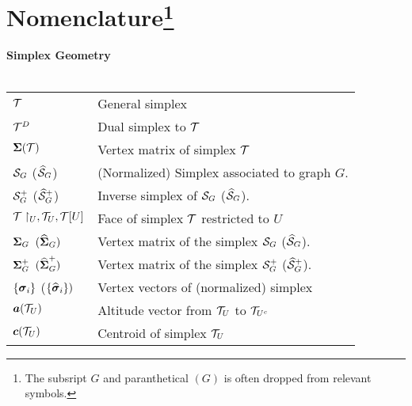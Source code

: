 \chapter*{Nomenclature\footnote{The subsript $G$ and paranthetical $(G)$ is often dropped from relevant symbols.}}

\newlength{\colwidth} %
\newlength{\groupsep} %
\newlength{\headingsep} %
\setlength{\colwidth}{3.5cm}
\setlength{\groupsep}{1cm}
\setlength{\headingsep}{0.05cm}

\textbf{Simplex Geometry}\\
\vspace{\headingsep}\\
\begin{tabular}{p{\colwidth}l}
	{$\mathcal{T}$} & {General simplex} \\
	$\mathcal{T}^D$ & Dual simplex to $\mathcal{T}$ \\
	$\boldsymbol{\Sigma}(\mathcal{T})$ & Vertex matrix of simplex $\mathcal{T}$ \\
	$\mathcal{S}_G$ ($\widehat{\mathcal{S}}_G$)  &  (Normalized) Simplex associated to graph $G$.\\
	$\mathcal{S}^+_G$ ($\widehat{\mathcal{S}}^+_G$)	& Inverse simplex of $\mathcal{S}_G$ ($\widehat{\mathcal{S}}_G$).\\
	{$\mathcal{T}\restriction_U, \mathcal{T}_U, \mathcal{T}[U]$} & {Face of simplex $\mathcal{T}$ restricted to $U$ }\\ 
	{$\boldsymbol{\Sigma}_G$ $(\widehat{\boldsymbol{\Sigma}}_G)$} & Vertex matrix of the simplex $\mathcal{S}_G$ ($\widehat{\mathcal{S}}_G$). \\
	{$\boldsymbol{\Sigma}_G^+$ $(\widehat{\boldsymbol{\Sigma}}_G^+)$} & Vertex matrix of the simplex $\mathcal{S}_G^+$ ($\widehat{\mathcal{S}}_G^+$). \\
	{$\{\vb*{\sigma}_i\}$ ($\{\widehat{\vb*{\sigma}}_i\})$} & {Vertex vectors of (normalized) simplex}\\
	{$\vb*{a}(\mathcal{T}_U)$} & {Altitude vector from $\mathcal{T}_U$ to $\mathcal{T}_{U^c}$}\\
	{$\vb*{c}(\mathcal{T}_U)$} & {Centroid of simplex $\mathcal{T}_U$}\\
\end{tabular}
\vspace{\groupsep}

